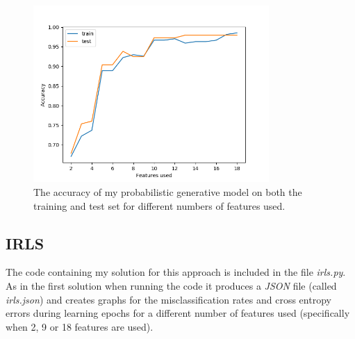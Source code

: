 \documentclass[a4paper,11pt]{article}
\begin{document}
\begin{figure}
\centering
\includegraphics[width=0.8\textwidth]{images/genmod_acc.png}
\caption{The accuracy of my probabilistic generative model on both the training and test set for different numbers of features used.}
\label{genmod:acc}
\end{figure} 

\subsection{IRLS}

The code containing my solution for this approach is included in the file \textit{irls.py}. As in the first solution when running the code it produces a \textit{JSON} file (called \textit{irls.json}) and creates graphs for the misclassification rates and cross entropy errors during learning epochs for a different number of features used (specifically when 2, 9 or 18 features are used).
\end{document}
